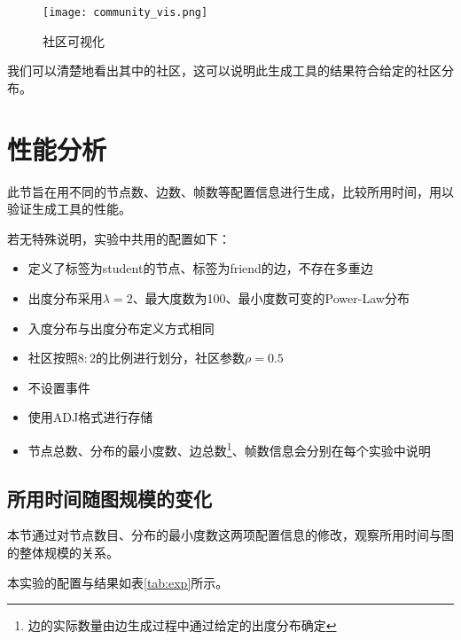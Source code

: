 \begin{figure}[H]
  \centering
  \texttt{[image: community\_vis.png]}
  \caption{社区可视化}
  \label{fig:community_vis}
\end{figure}

我们可以清楚地看出其中的社区，这可以说明此生成工具的结果符合给定的社区分布。

\section{性能分析}

此节旨在用不同的节点数、边数、帧数等配置信息进行生成，比较所用时间，用以验证生成工具的性能。

若无特殊说明，实验中共用的配置如下：

\begin{itemize}
  \item 定义了标签为student的节点、标签为friend的边，不存在多重边
  \item 出度分布采用$\lambda=2$、最大度数为100、最小度数可变的Power-Law分布
  \item 入度分布与出度分布定义方式相同
  \item 社区按照$8:2$的比例进行划分，社区参数$\rho=0.5$
  \item 不设置事件
  \item 使用ADJ格式进行存储
  \item 节点总数、分布的最小度数、边总数\footnote{边的实际数量由边生成过程中通过给定的出度分布确定}、帧数信息会分别在每个实验中说明
\end{itemize}

\subsection{所用时间随图规模的变化}

本节通过对节点数目、分布的最小度数这两项配置信息的修改，观察所用时间与图的整体规模的关系。

本实验的配置与结果如表\ref{tab:exp}所示。

